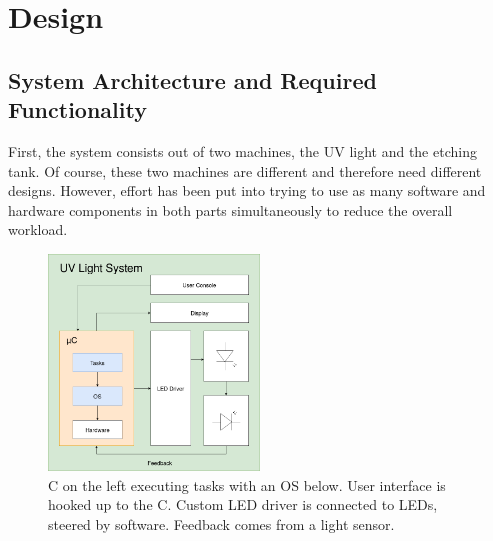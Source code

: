
\chapter{Design}
\label{chap:design} 
\section{System Architecture and Required Functionality}
\label{sec:system_arch_and_req}
First, the system consists out of two machines, the \gls{UV} light and the etching tank. Of course, these two machines are different and therefore need different designs. However, effort has been put into trying to use as many software and hardware components in both parts simultaneously to reduce the overall workload.  

\begin{figure}[H]                                                         
\centering          
\includegraphics[width=0.5\textwidth]{./fig/uv_light_simple}   
\caption[\mu C with user interface, custom LED driver and feedback loop.]{\mu C on the left executing tasks with an OS below. User interface is hooked up to the \mu C. Custom LED driver is connected to LEDs, steered by software. Feedback comes from a light sensor.}   
\label{fig:uv_light_simple}
\end{figure}  

